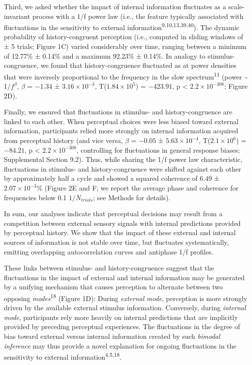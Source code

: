 \documentclass[
]{article}
\begin{document}
Third, we asked whether the impact of internal information fluctuates as
a scale-invariant process with a 1/f power law (i.e., the feature
typically associated with fluctuations in the sensitivity to external
information\textsuperscript{9,10,13,39,40}). The dynamic probability of
history-congruent perception (i.e., computed in sliding windows of ± 5
trials; Figure 1C) varied considerably over time, ranging between a
minimum of 12.77\% ± 0.14\% and a maximum 92.23\% ± 0.14\%. In analogy
to stimulus-congruence, we found that history-congruence fluctuated as
at power densities that were inversely proportional to the frequency in
the slow spectrum\textsuperscript{11} (power \textasciitilde{}
1/\(f^\beta\), \(\beta\) = \(-1.34\) ±
\(\ensuremath{3.16\times 10^{-3}}\),
T(\(\ensuremath{1.84\times 10^{5}}\)) = \(-423.91\), p < \(\ensuremath{2.2\times 10^{-308}}\); Figure
2D).

Finally, we ensured that fluctuations in stimulus- and
history-congruence are linked to each other. When perceptual choices
were less biased toward external information, participants relied more
strongly on internal information acquired from perceptual history (and
vice versa, \(\beta\) = \(-0.05\) ± \(\ensuremath{5.63\times 10^{-4}}\),
T(\(\ensuremath{2.1\times 10^{6}}\)) = \(-84.21\), p < \(\ensuremath{2.2\times 10^{-308}}\),
controlling for fluctuations in general response biases; Supplemental
Section 9.2). Thus, while sharing the 1/f power law characteristic,
fluctuations in stimulus- and history-congruence were shifted against
each other by approximately half a cycle and showed a squared coherence
of \(6.49\) ± \(\ensuremath{2.07\times 10^{-3}}\)\% (Figure 2E and F; we
report the average phase and coherence for frequencies below 0.1
\(1/N_{trials}\); see Methods for details).

In sum, our analyses indicate that perceptual decisions may result from
a competition between external sensory signals with internal predictions
provided by perceptual history. We show that the impact of these
external and internal sources of information is not stable over time,
but fluctuates systematically, emitting overlapping autocorrelation
curves and antiphase 1/f profiles.

These links between stimulus- and history-congruence suggest that the
fluctuations in the impact of external and internal information may be
generated by a unifying mechanism that causes perception to alternate
between two opposing \emph{modes}\textsuperscript{18} (Figure 1D):
During \emph{external mode}, perception is more strongly driven by the
available external stimulus information. Conversely, during
\emph{internal mode}, participants rely more heavily on internal
predictions that are implicitly provided by preceding perceptual
experiences. The fluctuations in the degree of bias toward external
versus internal information created by such \emph{bimodal inference} may
thus provide a novel explanation for ongoing fluctuations in the
sensitivity to external information\textsuperscript{4,5,18}.
\end{document}
